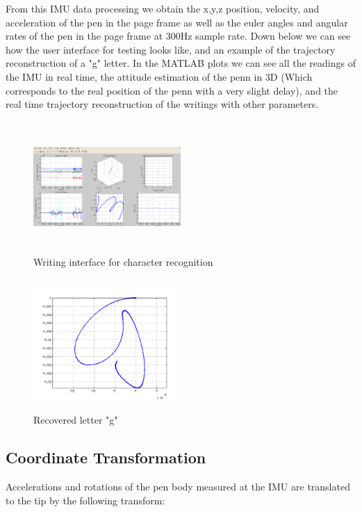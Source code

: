 \documentclass{article}
\begin{document}
From this IMU data processing we obtain the x,y,z position, velocity, and acceleration of the pen in the page frame as well as the euler angles and angular rates of the pen in the page frame at 300Hz sample rate. \newline
Down below we can see how the user interface for testing looks like, and an example of the trajectory reconstruction of a "g" letter. In the MATLAB plots we can see all the readings of the IMU in real time, the attitude estimation of the penn in 3D (Which corresponds to the real position of the penn with a very slight delay), and the real time trajectory reconstruction of the writings with other parameters.

\begin{figure}[H]
\centering
    \includegraphics[width=0.5\textwidth, height= 5cm]{interface.png}
    \caption{Writing interface for character recognition}
\end{figure}

\begin{figure}[H]
\centering
    \includegraphics[width=0.5\textwidth, height= 5cm]{g.png}
    \caption{Recovered letter "g"}
\end{figure}

\subsection{Coordinate Transformation}
Accelerations and rotations of the pen body measured at the IMU are translated to the tip by the following transform:
\end{document}
